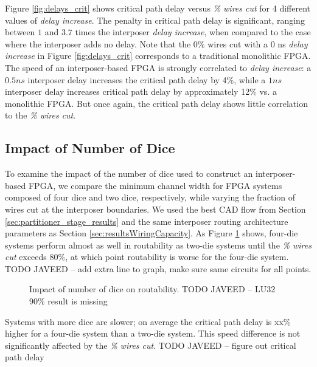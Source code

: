 \documentclass[journal]{IEEEtran}
\begin{document}
Figure \ref{fig:delays_crit} shows critical path delay versus \textit{\% wires cut} for 4 different values of \textit{delay increase}. The penalty in critical path delay is significant, ranging between $1$ and $3.7$ times the interposer \textit{delay increase}, when compared to the case where the interposer adds no delay. Note that the 0\% wires cut with a 0 ns \textit{delay increase} in Figure \ref{fig:delays_crit} corresponds to a traditional monolithic FPGA. The speed of an interposer-based FPGA is strongly correlated to \textit{delay increase}: a $0.5ns$ interposer delay increases the critical path delay by 4\%, while a $1ns$ interposer delay increases critical path delay by approximately 12\% vs. a monolithic FPGA. But once again, the critical path delay shows little correlation to the \textit{\% wires cut}.

\subsection{Impact of Number of Dice}
\label{num_dice_impact}
To examine the impact of the number of dice used to construct an interposer-based FPGA, we compare the minimum channel width for FPGA systems composed of four dice and two dice, respectively, while varying the fraction of wires cut at the interposer boundaries. We used the best CAD flow from Section \ref{sec:partitioner_stage_results} and the same interposer routing architecture parameters as Section \ref{sec:resultsWiringCapacity}. 
As Figure \ref{fig:wires_cut_4part} shows, four-die systems perform almost as well in routability as two-die systems until the \textit{\% wires cut} exceeds 80\%, at which point routability is worse for the four-die system. 
TODO JAVEED -- add extra line to graph, make sure same circuits for all points.

\begin{figure}[!htbp]
\centering

\caption{Impact of number of dice on routability. TODO JAVEED -- LU32 90\% result is missing}
\label{fig:wires_cut_4part}
\end{figure}

Systems with more dice are slower; on average the critical path delay is xx\% higher for a four-die system than a two-die system. This speed difference is not significantly affected by the \textit{\% wires cut}.
 TODO JAVEED -- figure out critical path delay %



\end{document}
